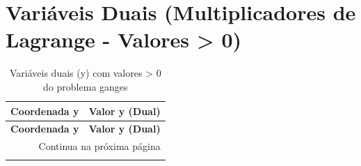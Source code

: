 \documentclass[12pt]{article}
\begin{document}
\section{Variáveis Duais (Multiplicadores de Lagrange - Valores > 0)}

\begin{longtable}{@{}cc@{}}
\caption{Variáveis duais (y) com valores > 0 do problema ganges} \\
\toprule
\textbf{Coordenada y} & \textbf{Valor y (Dual)} \\
\midrule
\endfirsthead

\toprule
\textbf{Coordenada y} & \textbf{Valor y (Dual)} \\
\midrule
\endhead

\midrule \multicolumn{2}{r}{{Continua na próxima página}} \\ \midrule
\endfoot


\end{longtable}
\end{document}
